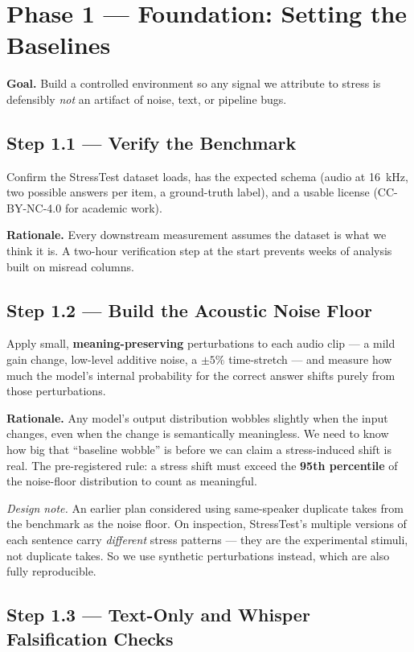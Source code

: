 \documentclass[11pt]{article}
\begin{document}
\section{Phase 1 --- Foundation: Setting the Baselines}

\textbf{Goal.} Build a controlled environment so any signal we
attribute to stress is defensibly \emph{not} an artifact of noise,
text, or pipeline bugs.

\subsection*{Step 1.1 --- Verify the Benchmark}

Confirm the StressTest dataset loads, has the expected schema (audio
at 16~kHz, two possible answers per item, a ground-truth label), and a
usable license (CC-BY-NC-4.0 for academic work).

\textbf{Rationale.} Every downstream measurement assumes the dataset
is what we think it is. A two-hour verification step at the start
prevents weeks of analysis built on misread columns.

\subsection*{Step 1.2 --- Build the Acoustic Noise Floor}

Apply small, \textbf{meaning-preserving} perturbations to each audio
clip --- a mild gain change, low-level additive noise, a $\pm 5\%$
time-stretch --- and measure how much the model's internal probability
for the correct answer shifts purely from those perturbations.

\textbf{Rationale.} Any model's output distribution wobbles slightly
when the input changes, even when the change is semantically
meaningless. We need to know how big that ``baseline wobble'' is
before we can claim a stress-induced shift is real. The
pre-registered rule: a stress shift must exceed the \textbf{95th
percentile} of the noise-floor distribution to count as meaningful.

\textit{Design note.} An earlier plan considered using same-speaker
duplicate takes from the benchmark as the noise floor. On inspection,
StressTest's multiple versions of each sentence carry \emph{different}
stress patterns --- they are the experimental stimuli, not duplicate
takes. So we use synthetic perturbations instead, which are also
fully reproducible.

\subsection*{Step 1.3 --- Text-Only and Whisper Falsification Checks}
\end{document}
